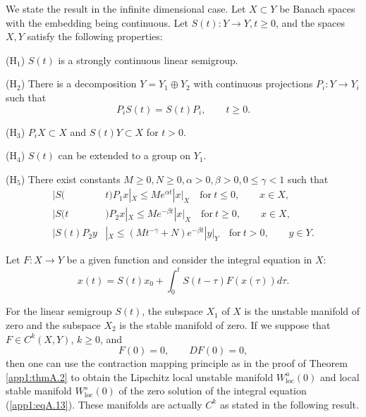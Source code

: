 \documentclass{surv-l}
\theoremstyle{plain}
\theoremstyle{definition}
\numberwithin{equation}{section}
\numberwithin{figure}{chapter}
\begin{document}
We state the result in the infinite dimensional case. Let $X\subset Y$ be Banach spaces with the embedding being continuous. Let $S(t)$:$\,Y\rightarrow Y,t\geq 0$, and the spaces $X,Y$ satisfy the following properties:

(H$_{1}$) $S(t)$ is a strongly continuous linear semigroup.

(H$_{2}$) There is a decomposition $Y=Y_{1}\oplus Y_{2}$ with continuous projections $P_{i}$:$\,Y\rightarrow Y_{i}$ such that
\begin{equation*}
P_{i}S(t)=S(t)P_{i},\qquad t\geq 0.
\end{equation*}

(H$_{3}$) $P_{i}X\subset X$ and $S(t)Y\subset X$ for $t>0$.

(H$_{4}$) $S(t)$ can be extended to a group on $Y_{1}$.

(H$_{5}$) There exist constants $M\geq 0,N\geq 0,\alpha>0,\beta>0,0\leq\gamma<1$ such that
\begin{align*}
|S(&t)P_{1}x|_{X}\leq Me^{\alpha t}|x|_{X}\quad\mathrm{for}\ t\leq 0,\qquad x\in X,\\
|S(t&)P_{2}x|_{X}\leq Me^{-\beta t}|x|_{X}\quad\mathrm{for}\ t\geq 0,\qquad x\in X,\\
|S(t)P_{2}y&|_{X}\leq(Mt^{-\gamma}+N)e^{-\beta t}|y|_{Y}\quad\mathrm{for}\ t>0,\qquad y\in Y.
\end{align*}

Let $F$:$\,X\rightarrow Y$ be a given function and consider the integral equation in $X$:
\begin{equation}\label{app1:eqA.13}
x(t)=S(t)x_{0}+\int_{0}^{t}S(t-\tau)F(x(\tau))d\tau.
\end{equation}

For the linear semigroup $S(t)$, the subspace $X_{1}$ of $X$ is the unstable manifold of zero and the subspace $X_{2}$ is the stable manifold of zero. If we suppose that $F\in C^{k}(X, Y)$, $k\geq 0$, and
\begin{equation}\label{app1:eqA.14}
F(0)=0,\qquad DF(0)=0,
\end{equation}
then one can use the contraction mapping principle as in the proof of Theorem \ref{app1:thmA.2} to obtain the Lipschitz local unstable manifold $W_{\mathrm{loc}}^{u}(0)$ and local stable manifold $W_{\mathrm{loc}}^{s}(0)$ of the zero solution of the integral equation (\ref{app1:eqA.13}). These manifolds are actually $C^{k}$ as stated in the following result.
\end{document}
